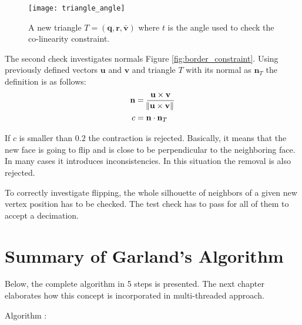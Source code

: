 \begin{figure}[H]
  \begin{center}
    \texttt{[image: triangle\_angle]}
    \caption{A new triangle $T = (\mathbf{q}, \mathbf{r}, \mathbf{\bar{v}})$  where $t$ is the angle used to check the co-linearity constraint.}
    \label{fig:gram}
  \end{center}
\end{figure}

\newpage
The second check investigates normals Figure \ref{fig:border_constraint}. Using previously defined vectors $\mathbf{u}$ and $\mathbf{v}$ and triangle $T$ with its normal as $\mathbf{n}_T$ the definition is as follows:
\begin{align}
\mathbf{n} &= \frac{ \mathbf{u} \times \mathbf{v}}{\norm{\mathbf{u} \times \mathbf{v}}}\\
c &= \mathbf{n} \cdot \mathbf{n}_T
\end{align}

If $c$ is smaller than $0.2$ the contraction is rejected. Basically, it means that the new face is going to flip and is close to be perpendicular to the neighboring face. In many cases it introduces inconsistencies. In this situation the removal is also rejected.

To correctly investigate flipping, the whole silhouette of neighbors of a given new vertex position has to be checked. The test check has to pass for all of them to accept a decimation.

\newpage
\section{Summary of Garland's Algorithm}

Below, the complete algorithm in 5 steps is presented. The next chapter elaborates how this concept is incorporated in multi-threaded approach.

Algorithm \cite{garland99}:

